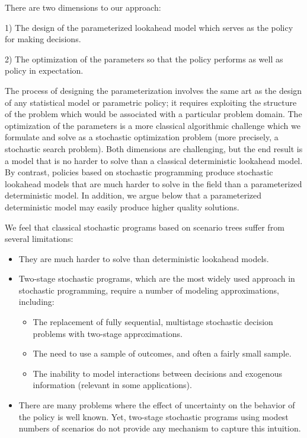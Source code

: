 \documentclass[11pt,oneside,fleqn,reqno,titlepage]{article}
\begin{document}
There are two dimensions to our approach:
\begin{description}
\item{1)} The design of the parameterized lookahead model which serves as the policy for making decisions.
\item{2)} The optimization of the parameters so that the policy performs as well as policy in expectation.
\end{description}
The process of designing the parameterization involves the same art as the design of any statistical model or parametric policy; it requires exploiting the structure of the problem which would be associated with a particular problem domain.  The optimization of the parameters is a more classical algorithmic challenge which we formulate and solve as a stochastic optimization problem (more precisely, a stochastic search problem).  Both dimensions are challenging, but the end result is a model that is no harder to solve than a classical deterministic lookahead model.  By contrast, policies based on stochastic programming produce stochastic lookahead models that are much harder to solve in the field than a parameterized deterministic model.  In addition, we argue below that a parameterized deterministic model may easily produce higher quality solutions.

We feel that classical stochastic programs based on scenario trees suffer from several limitations:
\begin{itemize}
    \item They are much harder to solve than deterministic lookahead models.
    \item Two-stage stochastic programs, which are the most widely used approach in stochastic programming, require a number of modeling approximations, including:
    \begin{itemize}
        \item The replacement of fully sequential, multistage stochastic decision problems with two-stage approximations.
        \item The need to use a sample of outcomes, and often a fairly small sample.
        \item The inability to model interactions between decisions and exogenous information (relevant in some applications).
    \end{itemize}
    \item There are many problems where the effect of uncertainty on the behavior of the policy is well known.  Yet, two-stage stochastic programs using modest numbers of scenarios do not provide any mechanism to capture this intuition.
\end{itemize}
\end{document}
